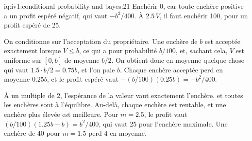 \begin{solution}{iq:iv1:conditional-probability-and-bayes:21}
Enchérir 0, car toute enchère positive a un profit espéré négatif, qui vaut $-b^2/400$. À $2.5\,V$, il faut enchérir 100, pour un profit espéré de 25.

On conditionne sur l'acceptation du propriétaire. Une enchère de $b$ est acceptée exactement lorsque $V \le b$, ce qui a pour probabilité $b/100$, et, sachant cela, $V$ est uniforme sur $[0, b]$ de moyenne $b/2$. On obtient donc en moyenne quelque chose qui vaut $1.5 \cdot b/2 = 0.75b$, et l'on paie $b$. Chaque enchère acceptée perd en moyenne $0.25b$, et le profit espéré vaut $-(b/100)(0.25b) = -b^2/400$.

À un multiple de 2, l'espérance de la valeur vaut exactement l'enchère, et toutes les enchères sont à l'équilibre. Au-delà, chaque enchère est rentable, et une enchère plus élevée est meilleure. Pour $m = 2.5$, le profit vaut $(b/100)(1.25b - b) = b^2/400$, qui vaut 25 pour l'enchère maximale. Une enchère de 40 pour $m = 1.5$ perd 4 en moyenne.

\end{solution}

